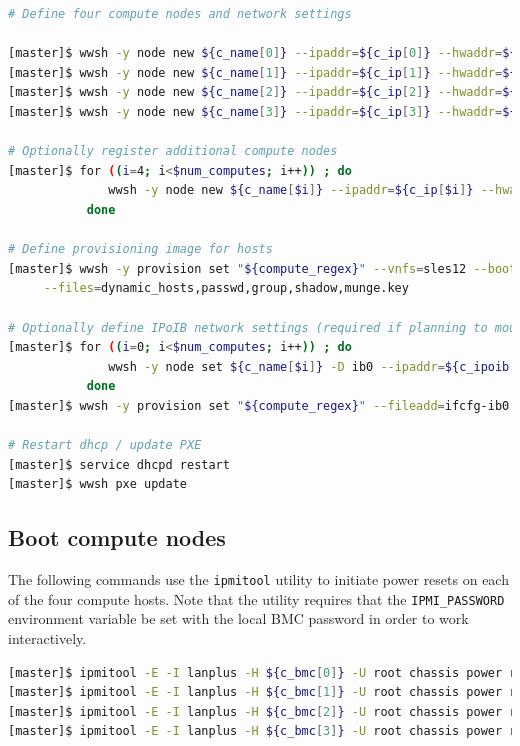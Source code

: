 \documentclass[letterpaper]{article}
\begin{document}
\begin{lstlisting}[language=bash,keywords={},upquote=true,basicstyle=\footnotesize\ttfamily]
# Define four compute nodes and network settings 

[master]$ wwsh -y node new ${c_name[0]} --ipaddr=${c_ip[0]} --hwaddr=${c_mac[0]} -D ${eth_provision}
[master]$ wwsh -y node new ${c_name[1]} --ipaddr=${c_ip[1]} --hwaddr=${c_mac[1]} -D ${eth_provision}
[master]$ wwsh -y node new ${c_name[2]} --ipaddr=${c_ip[2]} --hwaddr=${c_mac[2]} -D ${eth_provision}
[master]$ wwsh -y node new ${c_name[3]} --ipaddr=${c_ip[3]} --hwaddr=${c_mac[3]} -D ${eth_provision}

# Optionally register additional compute nodes
[master]$ for ((i=4; i<$num_computes; i++)) ; do
              wwsh -y node new ${c_name[$i]} --ipaddr=${c_ip[$i]} --hwaddr=${c_mac[$i]} -D ${eth_provision}
           done

# Define provisioning image for hosts
[master]$ wwsh -y provision set "${compute_regex}" --vnfs=sles12 --bootstrap=`uname -r` \
     --files=dynamic_hosts,passwd,group,shadow,munge.key 

# Optionally define IPoIB network settings (required if planning to mount Lustre over IB)
[master]$ for ((i=0; i<$num_computes; i++)) ; do
              wwsh -y node set ${c_name[$i]} -D ib0 --ipaddr=${c_ipoib[$i]} --netmask=${ipoib_netmask}
           done
[master]$ wwsh -y provision set "${compute_regex}" --fileadd=ifcfg-ib0.ww

# Restart dhcp / update PXE
[master]$ service dhcpd restart
[master]$ wwsh pxe update
\end{lstlisting}

\subsection{Boot compute nodes} \label{sec:boot_computes}

 
The following commands use the \texttt{ipmitool} utility to initiate power
resets on each of the four compute hosts. Note that the utility requires that
the \texttt{IPMI\_PASSWORD} environment variable be set with the local BMC password in
order to work interactively.


\begin{lstlisting}[language=bash,keywords={},upquote=true]
[master]$ ipmitool -E -I lanplus -H ${c_bmc[0]} -U root chassis power reset   # power cycle c1
[master]$ ipmitool -E -I lanplus -H ${c_bmc[1]} -U root chassis power reset   # power cycle c2
[master]$ ipmitool -E -I lanplus -H ${c_bmc[2]} -U root chassis power reset   # power cycle c3
[master]$ ipmitool -E -I lanplus -H ${c_bmc[3]} -U root chassis power reset   # power cycle c4
\end{lstlisting} 
\end{document}
